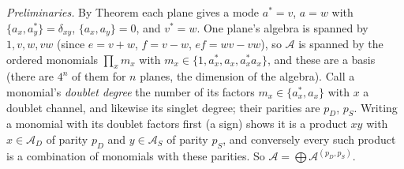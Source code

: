 \emph{Preliminaries.} By Theorem  each plane gives a mode $a^{*} = v$, $a = w$ with $\{a_{x}, a_{y}^{*}\} = \delta_{xy}$, $\{a_{x}, a_{y}\} = 0$, and $v^{*} = w$. One plane's algebra is spanned by $1, v, w, vw$ (since $e = v + w$, $f = v - w$, $ef = wv - vw$), so $\mathcal{A}$ is spanned by the ordered monomials $\prod_{x}m_{x}$ with $m_{x} \in \{1, a_{x}^{*}, a_{x}, a_{x}^{*}a_{x}\}$, and these are a basis (there are $4^{n}$ of them for $n$ planes, the dimension of the algebra). Call a monomial's \emph{doublet degree} the number of its factors $m_{x} \in \{a_{x}^{*}, a_{x}\}$ with $x$ a doublet channel, and likewise its singlet degree; their parities are $p_{D}$, $p_{S}$. Writing a monomial with its doublet factors first (a sign) shows it is a product $xy$ with $x \in \mathcal{A}_{D}$ of parity $p_{D}$ and $y \in \mathcal{A}_{S}$ of parity $p_{S}$, and conversely every such product is a combination of monomials with these parities. So $\mathcal{A} = \bigoplus\mathcal{A}^{(p_{D}, p_{S})}$.

